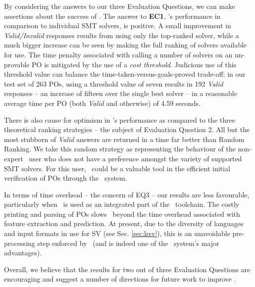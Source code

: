 By considering the answers to our three Evaluation Questions, we can make assertions about the success of  \where.
The answer to \textbf{EC1}, \where's performance in comparison to individual SMT solvers, is positive.
A small improvement in \textit{Valid/Invalid} responses results from using only the top-ranked solver, while a much bigger increase can be seen by making the full ranking of solvers available for use.
The time penalty associated with calling a number of solvers on an un-provable PO is mitigated by the use of a \textit{cost threshold}.
Judicious use of this threshold value can balance the time-taken-versus-goals-proved trade-off: in our test set of 263 POs, using a threshold value of seven results in 192 \textit{Valid} responses -- an increase of fifteen over the single best solver -- in a reasonable average time per PO (both \textit{Valid} and otherwise) of 4.59 seconds.

There is also cause for optimism in \where's performance as compared to the three theoretical ranking strategies -- the subject of Evaluation Question 2. 
All but the most stubborn of \textit{Valid} answers are returned in a time far better than \textsf{Random Ranking}.
We take this random strategy as representing the behaviour of the non-expert \why~user who does not have a preference amongst the variety of supported SMT solvers.
For this user, \where~could be a valuable tool in the efficient initial verification of POs through the \why~system.    

In terms of time overhead -- the concern of EQ3 -- our results are less favourable, particularly when \where~is used as an integrated part of the \why~toolchain.
The costly printing and parsing of POs slows \where~beyond the time overhead associated with feature extraction and prediction.
At present, due to the diversity of languages and input formats in use for SV (see Sec. \ref{sec:lrsv}), this is an unavoidable pre-processing step enforced by \why~(and is indeed one of the \why~system's major advantages).

Overall, we believe that the results for two out of three Evaluation Questions are encouraging and suggest a number of directions for future work to improve \where.
 

 

